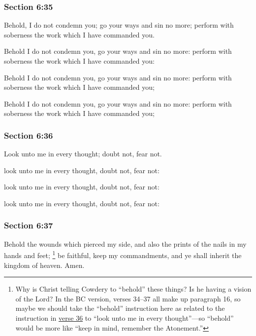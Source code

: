 	\subsubsection{Section 6:35} %
		\label{DC6-35}

		Behold, I do not condemn you; go your ways and sin no more; perform with soberness the work which I have commanded you.

		\begin{framed}
		\scriptsize
			\begin{compactdesc}
				\item[JSP] Behold I do not condemn you, go your ways and sin no more: perform with soberness the work which I have commanded you:
				\item[DC 1835] Behold I do not condemn you, go your ways and sin no more: perform with soberness the work which I have commanded you;
				\item[DC 1844] Behold I do not condemn you, go your ways and sin no more: perform with soberness the work which I have commanded you;
			\end{compactdesc}
		\end{framed}

	\subsubsection{Section 6:36} %
		\label{DC6-36}

		Look unto me in every thought; doubt not, fear not.

		\begin{framed}
		\scriptsize
			\begin{compactdesc}
				\item[JSP] look unto me in every thought, doubt not, fear not: 
				\item[DC 1835] look unto me in every thought, doubt not, fear not:
				\item[DC 1844] look unto me in every thought, doubt not, fear not: 
			\end{compactdesc}
		\end{framed}

	\subsubsection{Section 6:37} %
		\label{DC6-37}

		Behold the wounds which pierced my side, and also the prints of the nails in my hands and feet;%
			\footnote{%
				Why is Christ telling Cowdery to ``behold'' these things? Is he having a vision of the Lord? In the BC version, verses 34--37 all make up paragraph 16, so maybe we should take the ``behold'' instruction here as related to the instruction in \hyperref[DC6-36]{verse 36} to ``look unto me in every thought''---so ``behold'' would be more like ``keep in mind, remember the Atonement.'' 
				}
		be faithful, keep my commandments, and ye shall inherit the kingdom of heaven. Amen.

